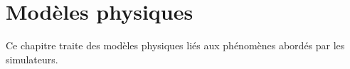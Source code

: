 \chapter{Modèles physiques}
%
Ce chapitre traite des modèles physiques liés aux phénomènes abordés par les simulateurs.
%





%
%
